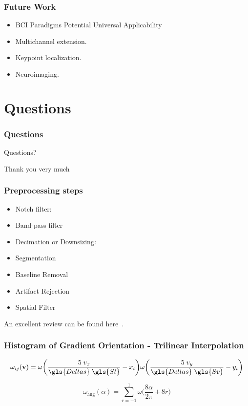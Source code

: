 \documentclass[aspectratio=169]{beamer}
\newcommand\Fontre{\fontsize{16}{16.2}\selectfont}
\begin{document}
    \begin{frame}
        \frametitle{Future Work}
        \begin{center}
            \begin{itemize}
                \item \Fontre BCI Paradigms Potential Universal Applicability
                \item \Fontre Multichannel extension.
                \item \Fontre Keypoint localization.
                \item \Fontre Neuroimaging.
            \end{itemize}
        \end{center}
    \end{frame}       
   
        \section{Questions}
    \begin{frame} %
        \frametitle{Questions}
        \begin{center}
        \LARGE Questions?
        \end{center}
    \end{frame}
    
    \begin{frame} %
        \begin{center}
        \LARGE Thank you very much
        \end{center}
    \end{frame}


\begin{frame}
\frametitle{Preprocessing steps}
\begin{itemize}
\item Notch filter:
\item Band-pass filter
\item Decimation or Downsizing:
\item Segmentation
\item Baseline Removal
\item Artifact Rejection
\item Spatial Filter
\end{itemize}
An excellent review can be found here~.
\end{frame}



\begin{frame}
\frametitle{Histogram of Gradient Orientation - Trilinear Interpolation}
\begin{equation}
 \omega_{ij}(\mathbf{v}) = \omega \bigg ( \frac{5 \;v_x}{\gls{Deltas} \; \gls{St}} - x_i \bigg ) \omega \bigg ( \frac{5 \; v_y}{\gls{Deltas} \; \gls{Sv}} - y_i \bigg ) 
\label{eq:ij}
\end{equation}

\begin{equation}
 \omega_\mathrm{ang}(\alpha) = \sum_{r=-1}^{1} \omega \bigg ( \frac{8\alpha}{2\pi} + 8r \bigg )
\label{eq:wang}
\end{equation}
\end{frame}
\end{document}
